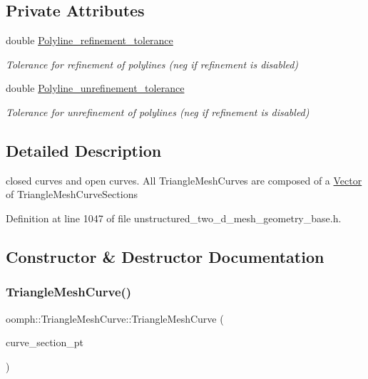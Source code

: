 \subsection*{Private Attributes}
\begin{DoxyCompactItemize}
\item 
double \hyperlink{classoomph_1_1TriangleMeshCurve_acc89a4f3f6d43568335131c8db0f1738}{Polyline\+\_\+refinement\+\_\+tolerance}
\begin{DoxyCompactList}\small\item\em Tolerance for refinement of polylines (neg if refinement is disabled) \end{DoxyCompactList}\item 
double \hyperlink{classoomph_1_1TriangleMeshCurve_a0b44a7d207bff00f30e0f83b84816bae}{Polyline\+\_\+unrefinement\+\_\+tolerance}
\begin{DoxyCompactList}\small\item\em Tolerance for unrefinement of polylines (neg if refinement is disabled) \end{DoxyCompactList}\end{DoxyCompactItemize}


\subsection{Detailed Description}
closed curves and open curves. All Triangle\+Mesh\+Curves are composed of a \hyperlink{classoomph_1_1Vector}{Vector} of Triangle\+Mesh\+Curve\+Sections 

Definition at line 1047 of file unstructured\+\_\+two\+\_\+d\+\_\+mesh\+\_\+geometry\+\_\+base.\+h.



\subsection{Constructor \& Destructor Documentation}
\mbox{\label{classoomph_1_1TriangleMeshCurve_a98c1c95a35c0ba3843a2dc0982ea3185}} 
\subsubsection{\texorpdfstring{Triangle\+Mesh\+Curve()}{TriangleMeshCurve()}}
{\footnotesize\ttfamily oomph\+::\+Triangle\+Mesh\+Curve\+::\+Triangle\+Mesh\+Curve (\begin{DoxyParamCaption}\item[{const \hyperlink{classoomph_1_1Vector}{Vector}$<$ \hyperlink{classoomph_1_1TriangleMeshCurveSection}{Triangle\+Mesh\+Curve\+Section} $\ast$$>$ \&}]{curve\+\_\+section\+\_\+pt }\end{DoxyParamCaption})\hspace{0.3cm}{\ttfamily [inline]}}




